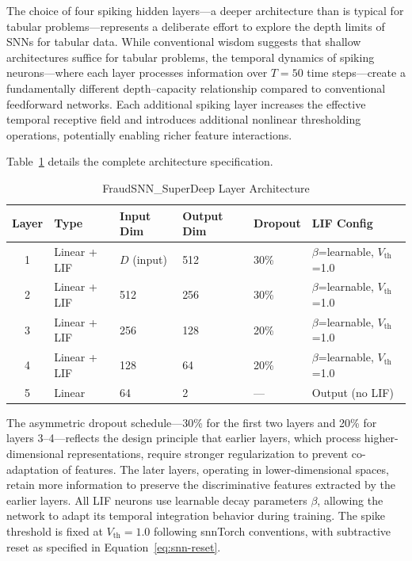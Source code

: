 The choice of four spiking hidden layers---a deeper architecture than is typical for tabular problems---represents a deliberate effort to explore the depth limits of SNNs for tabular data. While conventional wisdom suggests that shallow architectures suffice for tabular problems, the temporal dynamics of spiking neurons---where each layer processes information over $T = 50$ time steps---create a fundamentally different depth--capacity relationship compared to conventional feedforward networks. Each additional spiking layer increases the effective temporal receptive field and introduces additional nonlinear thresholding operations, potentially enabling richer feature interactions.

Table~\ref{tab:snn-architecture} details the complete architecture specification.

\begin{table}[H]
\centering
\caption{FraudSNN\_SuperDeep Layer Architecture}
\label{tab:snn-architecture}
\small
\begin{tabularx}{0.95\textwidth}{clXllX}
\toprule
\textbf{Layer} & \textbf{Type} & \textbf{Input Dim} & \textbf{Output Dim} & \textbf{Dropout} & \textbf{LIF Config} \\
\midrule
1 & Linear + LIF & $D$ (input) & 512 & 30\% & $\beta$=learnable, $V_{\text{th}}$=1.0 \\
2 & Linear + LIF & 512 & 256 & 30\% & $\beta$=learnable, $V_{\text{th}}$=1.0 \\
3 & Linear + LIF & 256 & 128 & 20\% & $\beta$=learnable, $V_{\text{th}}$=1.0 \\
4 & Linear + LIF & 128 & 64 & 20\% & $\beta$=learnable, $V_{\text{th}}$=1.0 \\
5 & Linear & 64 & 2 & --- & Output (no LIF) \\
\bottomrule
\end{tabularx}
\end{table}

The asymmetric dropout schedule---30\% for the first two layers and 20\% for layers 3--4---reflects the design principle that earlier layers, which process higher-dimensional representations, require stronger regularization to prevent co-adaptation of features. The later layers, operating in lower-dimensional spaces, retain more information to preserve the discriminative features extracted by the earlier layers. All LIF neurons use learnable decay parameters $\beta$, allowing the network to adapt its temporal integration behavior during training. The spike threshold is fixed at $V_{\text{th}} = 1.0$ following snnTorch conventions, with subtractive reset as specified in Equation~\ref{eq:snn-reset}.


